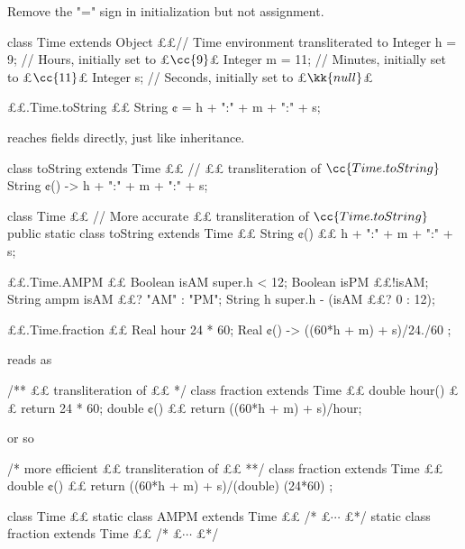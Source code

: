 Remove the "=" sign in initialization but not assignment.
\begin{java}
class Time extends Object {££// Time environment transliterated to \Java
  Integer h = 9;     // Hours, initially set to £$\cc{9}$£
  Integer m = 11;    // Minutes, initially set to £$\cc{11}$£
  Integer s;         // Seconds, initially set to £$\kk{null}$£
} 
\end{java}

\begin{reap}
££.Time.toString {££
  String ¢ = h + ":" + m + ":" + s;
}
\end{reap}
reaches fields directly, just like inheritance.

\begin{java}
class toString extends Time {££ // £\Java£ transliteration of $\cc{Time.toString}$
  String ¢() ->  h + ":" + m + ":" + s;
} 
\end{java}

\begin{java}
class Time {££ // More accurate £\Java£ transliteration of $\cc{Time.toString}$
  public static class toString extends Time {££
    String ¢() {££
       h + ":" + m + ":" + s;
    }
  }
} 
\end{java}

\begin{reap}
££.Time.AMPM {££
  Boolean isAM super.h < 12;
  Boolean isPM ££!isAM;
  String ampm isAM ££? "AM" : "PM";
  String h super.h - (isAM ££? 0 : 12);
}
\end{reap}

\begin{reap}
££.Time.fraction {££
  Real hour 24 * 60;
  Real ¢() -> ((60*h + m) + s)/24./60 ;
}
\end{reap}
reads as
\begin{java}
/** £\Java£ transliteration of ££
*/
class fraction extends Time {££ 
  double hour() {££ return  24 * 60; }
  double ¢() {££ return ((60*h + m) + s)/hour; }
}
\end{java}
or so
\begin{java}
/* more efficient £\Java£ transliteration of ££
**/
class fraction extends Time {££ 
  double ¢() {££ return ((60*h + m) + s)/(double) (24*60) ; }
}
\end{java}

\begin{java}
class Time {££
  static class AMPM extends Time {££ /* £$⋯$ £*/ }
  static class fraction extends Time {££ /* £$⋯$ £*/}
}
\end{java}

